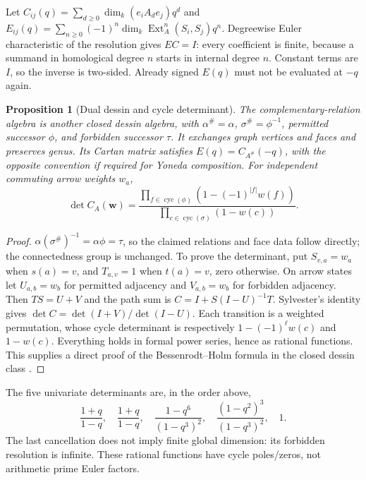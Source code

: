 \documentclass[11pt]{article}
\newtheorem{proposition}[theorem]{Proposition}
\theoremstyle{definition}\newtheorem{definition}[theorem]{Definition}
\theoremstyle{remark}\newtheorem{remark}[theorem]{Remark}
\begin{document}
Let $C_{ij}(q)=\sum_{d\ge0}\dim_k(e_iA_de_j)q^d$ and $E_{ij}(q)=\sum_{n\ge0}(-1)^n\dim_k\operatorname{Ext}_A^n(S_i,S_j)q^n$. Degreewise Euler characteristic of the resolution gives $EC=I$: every coefficient is finite, because a summand in homological degree $n$ starts in internal degree $n$. Constant terms are $I$, so the inverse is two-sided. Already signed $E(q)$ must not be evaluated at $-q$ again.

\begin{proposition}[Dual dessin and cycle determinant]\label{thm:cartan}
The complementary-relation algebra is another closed dessin algebra, with $\alpha^\#=\alpha$, $\sigma^\#=\phi^{-1}$, permitted successor $\phi$, and forbidden successor $\tau$. It exchanges graph vertices and faces and preserves genus. Its Cartan matrix satisfies $E(q)=C_{A^\#}(-q)$, with the opposite convention if required for Yoneda composition. For independent commuting arrow weights $w_a$,
\[
 \det C_A(\mathbf w)=
 \frac{\prod_{f\in\operatorname{cyc}(\phi)}(1-(-1)^{|f|}w(f))}
 {\prod_{c\in\operatorname{cyc}(\sigma)}(1-w(c))}.
\]
\end{proposition}
\begin{proof}
$\alpha(\sigma^\#)^{-1}=\alpha\phi=\tau$, so the claimed relations and face data follow directly; the connectedness group is unchanged. To prove the determinant, put $S_{v,a}=w_a$ when $s(a)=v$, and $T_{a,v}=1$ when $t(a)=v$, zero otherwise. On arrow states let $U_{a,b}=w_b$ for permitted adjacency and $V_{a,b}=w_b$ for forbidden adjacency. Then $TS=U+V$ and the path sum is $C=I+S(I-U)^{-1}T$. Sylvester's identity gives $\det C=\det(I+V)/\det(I-U)$. Each transition is a weighted permutation, whose cycle determinant is respectively $1-(-1)^\ell w(c)$ and $1-w(c)$. Everything holds in formal power series, hence as rational functions. This supplies a direct proof of the Bessenrodt--Holm formula in the closed dessin class \cite{BessenrodtHolm}.
\end{proof}
The five univariate determinants are, in the order above,
\[
 \frac{1+q}{1-q},\quad\frac{1+q}{1-q},\quad
 \frac{1-q^6}{(1-q^3)^2},\quad
 \frac{(1-q^2)^3}{(1-q^3)^2},\quad 1.
\]
The last cancellation does not imply finite global dimension: its forbidden resolution is infinite. These rational functions have cycle poles/zeros, not arithmetic prime Euler factors.
\end{document}
